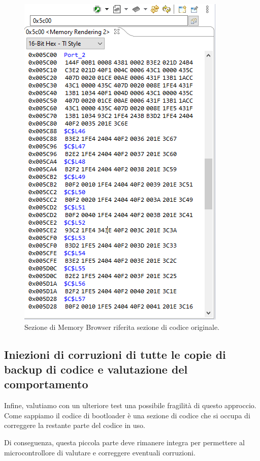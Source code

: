 \documentclass[LaM,binding=0.6cm,oneside]{../sapthesis}
\begin{document}
\begin{figure}[htbp]
\centerline{\includegraphics[scale=0.55]{examples/BootloaderTestCorruzioni1.PNG}}
\caption{Sezione di Memory Browser riferita sezione di codice originale.}
\label{fig}
\end{figure}


\subsection{Iniezioni di corruzioni di tutte le copie di backup di codice e valutazione del comportamento }

Infine, valutiamo con un ulteriore test una possibile fragilità di questo approccio. Come sappiamo il codice di bootloader è una sezione di codice che si occupa di correggere la restante parte del
codice in uso.

Di conseguenza, questa piccola parte deve rimanere integra per permettere al microcontrollore di valutare e correggere eventuali corruzioni.
\end{document}

